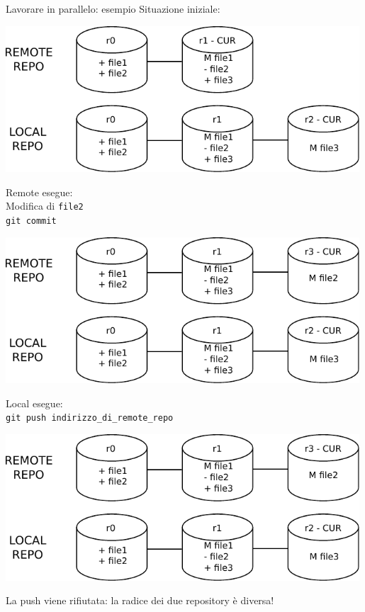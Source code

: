 \documentclass[presentation]{beamer}
\begin{document}
\begin{frame}{Lavorare in parallelo: esempio}
	Situazione iniziale:
	\begin{center}
		\includegraphics[width=0.99\textwidth]{img/draw5}
	\end{center}
	\framebreak{}

	Remote esegue:\\
	Modifica di \texttt{file2} \\
	\texttt{git commit} \\
	\begin{center}
		\includegraphics[width=0.99\textwidth]{img/draw7}
	\end{center}
	\framebreak{}

	Local esegue:\\
	\texttt{git push indirizzo\_di\_remote\_repo} \\
	\begin{center}
		\includegraphics[width=0.99\textwidth]{img/draw7}
	\end{center}
	La push viene rifiutata: la radice dei due repository è diversa!
	\framebreak{}


\end{frame}
\end{document}
